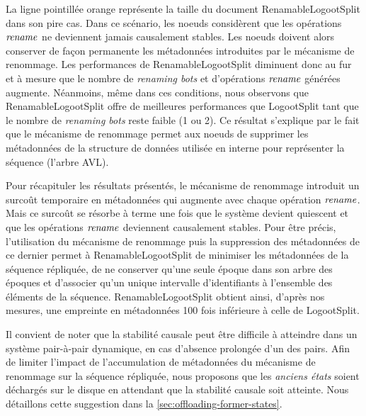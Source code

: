 La ligne pointillée orange représente la taille du document RenamableLogootSplit dans son pire cas.
Dans ce scénario, les noeuds considèrent que les opérations $\mathit{rename}$ ne deviennent jamais causalement stables.
Les noeuds doivent alors conserver de façon permanente les métadonnées introduites par le mécanisme de renommage.
Les performances de RenamableLogootSplit diminuent donc au fur et à mesure que le nombre de \emph{renaming bots} et d'opérations $\mathit{rename}$ générées augmente.
Néanmoins, même dans ces conditions, nous observons que RenamableLogootSplit offre de meilleures performances que LogootSplit tant que le nombre de \emph{renaming bots} reste faible (1 ou 2).
Ce résultat s'explique par le fait que le mécanisme de renommage permet aux noeuds de supprimer les métadonnées de la structure de données utilisée en interne pour représenter la séquence (\ie l'arbre AVL).

Pour récapituler les résultats présentés, le mécanisme de renommage introduit un surcoût temporaire en métadonnées qui augmente avec chaque opération $\mathit{rename}$.
Mais ce surcoût se résorbe à terme une fois que le système devient quiescent et que les opérations $\mathit{rename}$ deviennent causalement stables.
Pour être précis, l'utilisation du mécanisme de renommage puis la suppression des métadonnées de ce dernier permet à RenamableLogootSplit de minimiser les métadonnées de la séquence répliquée, \ie de ne conserver qu'une seule époque dans son arbre des époques et d'associer qu'un unique intervalle d'identifiants à l'ensemble des éléments de la séquence.
RenamableLogootSplit obtient ainsi, d'après nos mesures, une empreinte en métadonnées 100 fois inférieure à celle de LogootSplit.

Il convient de noter que la stabilité causale peut être difficile à atteindre dans un système pair-à-pair dynamique, \eg en cas d'absence prolongée d'un des pairs.
Afin de limiter l'impact de l'accumulation de métadonnées du mécanisme de renommage sur la séquence répliquée, nous proposons que les \emph{anciens états} soient déchargés sur le disque en attendant que la stabilité causale soit atteinte.
Nous détaillons cette suggestion dans la \autoref{sec:offloading-former-states}.


